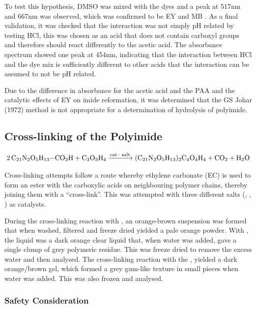 To test this hypothesis, DMSO was mixed with the dyes and a peak at 517nm and 667nm was observed, which was confirmed to be EY \cite{chakraborty2011spectral} and MB \cite{gilani2013solvatochromism,hemdan2023shift,tchaikovskaya2023solvent}. As a final validation, it was checked that the interaction was not simply pH related by testing HCl, this was chosen as an acid that does not contain carboxyl groups and therefore should react differently to the acetic acid. The absorbance spectrum showed one peak at 454nm, indicating that the interaction between HCl and the dye mix is sufficiently different to other acids that the interaction can be assumed to not be pH related.

Due to the difference in absorbance for the acetic acid and the PAA and the catalytic effects of EY on imide reformation, it was determined that the GS Johar (1972) method is not appropriate for a determination of hydrolysis of polyimide. 





\subsection{Cross-linking of the Polyimide}
\begin{equation}
    \ce{2 C21N2O5H13-CO2H + C3O3H4 ->[cat. salt] (C21N2O5H13)2C4O4H4 + CO2 + H2O}
    \label{eq:crosslink}
\end{equation}

Cross-linking attempts follow a route whereby ethylene carbonate (EC) is used to form an ester with the carboxylic acids on neighbouring polymer chains, thereby joining them  with a ``cross-link''. This was attempted with three different salts (, , ) as catalysts. 

During the cross-linking reaction with , an orange-brown suspension was formed that when washed, filtered and freeze dried yielded a pale orange powder. With , the liquid was a dark orange clear liquid that, when water was added, gave a single clump of grey polymeric residue. This was freeze dried to remove the excess water and then analysed. The cross-linking reaction with the , yielded a dark orange/brown gel, which formed a grey gum-like texture in small pieces when water was added. This was also frozen and analysed. 


\subsubsection{Safety Consideration}

